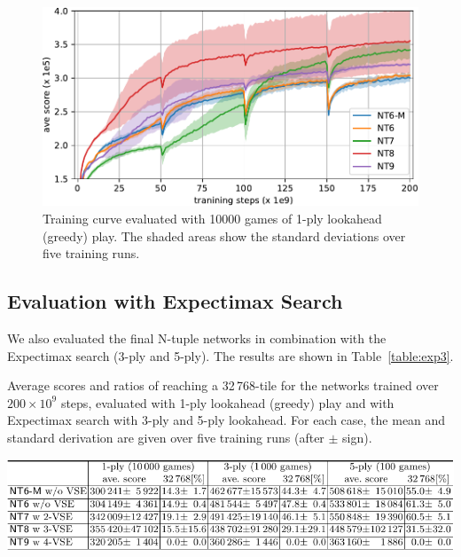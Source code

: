 \begin{figure}[ht]
 \includegraphics[width=.98\linewidth]{figures/plot-exp2.pdf}
 \caption{Training curve evaluated with 10000 games of 1-ply lookahead (greedy) play. The shaded areas show the standard deviations over five training runs.}
 \label{fig:exp2}
\end{figure}

\subsection{Evaluation with Expectimax Search}
We also evaluated the final N-tuple networks in combination with the Expectimax search (3-ply and 5-ply).
The results are shown in Table~\ref{table:exp3}.

\begin{table}[ht]
 \caption{Average scores and ratios of reaching a 32\,768-tile for the networks trained over $200\times 10^9$ steps, evaluated with 1-ply lookahead (greedy) play and with Expectimax search with 3-ply and 5-ply lookahead. For each case, the mean and standard derivation are given over five training runs (after $\pm$ sign).}
 \label{table:exp3}
 \centering\includegraphics[width=.99\linewidth]{figures/table-exp3.pdf}
\end{table}

